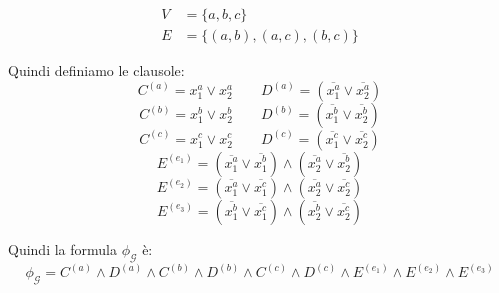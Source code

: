 \begin{minipage}{0.5\textwidth}
    \begin{figure}[H]
        \centering
    \end{figure}
\end{minipage}
\begin{minipage}{0.5\textwidth}
    \begin{align*}
        V &= \{a, b, c\} \\
        E &= \{(a, b), (a, c), (b, c)\}
    \end{align*}
\end{minipage}

Quindi definiamo le clausole:
\[
  C^{(a)} = x_1^a \lor x_2^a
 \qquad
  D^{(a)} = (\overline{x_1^a} \lor \overline{x_2^a})
\]
\[
  C^{(b)} = x_1^b \lor x_2^b
  \qquad
  D^{(b)} = (\overline{x_1^b} \lor \overline{x_2^b})
\]
\[
  C^{(c)} = x_1^c \lor x_2^c
  \qquad
  D^{(c)} = (\overline{x_1^c} \lor \overline{x_2^c})
\]
\[ 
    E^{(e_1)} = (\overline{x_1^a} \lor \overline{x_1^b}) \land (\overline{x_2^a} \lor \overline{x_2^b})
\]
\[ 
    E^{(e_2)} = (\overline{x_1^a} \lor \overline{x_1^c}) \land (\overline{x_2^a} \lor \overline{x_2^c})
\]
\[ 
    E^{(e_3)} = (\overline{x_1^b} \lor \overline{x_1^c}) \land (\overline{x_2^b} \lor \overline{x_2^c})
\]

Quindi la formula $\phi_\mathcal{G}$ è:
\[
    \phi_\mathcal{G} = C^{(a)} \land D^{(a)} \land C^{(b)} \land D^{(b)} \land C^{(c)} \land D^{(c)} \land E^{(e_1)} \land E^{(e_2)} \land E^{(e_3)}
\]

